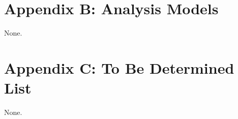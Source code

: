 \documentclass{scrreprt}
\begin{document}
\section{Appendix B: Analysis Models}
\begin{CJK}{UTF8}{<font>}
None.
\end{CJK}

\section{Appendix C: To Be Determined List}
\begin{CJK}{UTF8}{<font>}
None.
\end{CJK}
\end{document}
